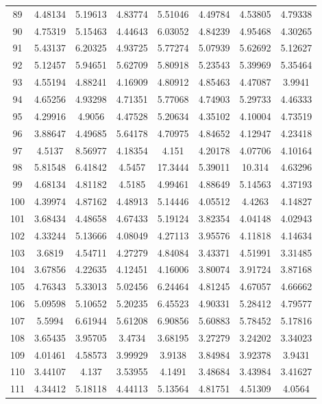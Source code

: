 \begin{center}
\begin{longtable}{cccccccc}
89 & 4.48134 & 5.19613 & 4.83774 & 5.51046 & 4.49784 & 4.53805 & 4.79338\\
90 & 4.75319 & 5.15463 & 4.44643 & 6.03052 & 4.84239 & 4.95468 & 4.30265\\
91 & 5.43137 & 6.20325 & 4.93725 & 5.77274 & 5.07939 & 5.62692 & 5.12627\\
92 & 5.12457 & 5.94651 & 5.62709 & 5.80918 & 5.23543 & 5.39969 & 5.35464\\
93 & 4.55194 & 4.88241 & 4.16909 & 4.80912 & 4.85463 & 4.47087 & 3.9941\\
94 & 4.65256 & 4.93298 & 4.71351 & 5.77068 & 4.74903 & 5.29733 & 4.46333\\
95 & 4.29916 & 4.9056 & 4.47528 & 5.20634 & 4.35102 & 4.10004 & 4.73519\\
96 & 3.88647 & 4.49685 & 5.64178 & 4.70975 & 4.84652 & 4.12947 & 4.23418\\
97 & 4.5137 & 8.56977 & 4.18354 & 4.151 & 4.20178 & 4.07706 & 4.10164\\
98 & 5.81548 & 6.41842 & 4.5457 & 17.3444 & 5.39011 & 10.314 & 4.63296\\
99 & 4.68134 & 4.81182 & 4.5185 & 4.99461 & 4.88649 & 5.14563 & 4.37193\\
100 & 4.39974 & 4.87162 & 4.48913 & 5.14446 & 4.05512 & 4.4263 & 4.14827\\
101 & 3.68434 & 4.48658 & 4.67433 & 5.19124 & 3.82354 & 4.04148 & 4.02943\\
102 & 4.33244 & 5.13666 & 4.08049 & 4.27113 & 3.95576 & 4.11818 & 4.14634\\
103 & 3.6819 & 4.54711 & 4.27279 & 4.84084 & 3.43371 & 4.51991 & 3.31485\\
104 & 3.67856 & 4.22635 & 4.12451 & 4.16006 & 3.80074 & 3.91724 & 3.87168\\
105 & 4.76343 & 5.33013 & 5.02456 & 6.24464 & 4.81245 & 4.67057 & 4.66662\\
106 & 5.09598 & 5.10652 & 5.20235 & 6.45523 & 4.90331 & 5.28412 & 4.79577\\
107 & 5.5994 & 6.61944 & 5.61208 & 6.90856 & 5.60883 & 5.78452 & 5.17816\\
108 & 3.65435 & 3.95705 & 3.4734 & 3.68195 & 3.27279 & 3.24202 & 3.34023\\
109 & 4.01461 & 4.58573 & 3.99929 & 3.9138 & 3.84984 & 3.92378 & 3.9431\\
110 & 3.44107 & 4.137 & 3.53955 & 4.1491 & 3.48684 & 3.43984 & 3.41627\\
111 & 4.34412 & 5.18118 & 4.44113 & 5.13564 & 4.81751 & 4.51309 & 4.0564\\

\end{longtable}
\end{center}
